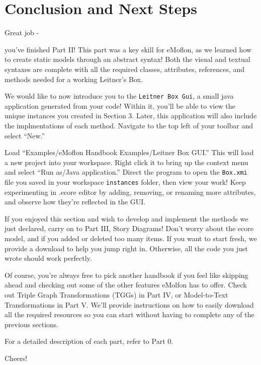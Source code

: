 \genHeader
\section{Conclusion and Next Steps}

\hypertarget{conclusion}{Great job -} you've finished Part II! This part was a key skill for eMoflon, as we learned how to create static models through an abstract syntax! Both the visual and textual syntaxes are complete with all the required classes, attributes, references, and methods needed for a working Leitner's Box.

We would like to now introduce you to the \texttt{Leitner Box Gui}, a small java application generated from your code! Within it, you'll be able to view the unique instances you created in Section 3. Later, this application will also include the implmentations of each method. Navigate to the top left of your toolbar and select ``New.''

Load ``Examples/eMoflon Handbook Examples/Leitner Box GUI.'' This will load a new project into your workspace. Right click it to bring up the context menu and select ``Run as/Java application.'' Direct the program to open the \texttt{Box.xmi} file you saved in your workspace \texttt{instances} folder, then view your work! Keep experimenting in .ecore editor by adding, removing, or renaming more attributes, and observe how they're reflected in the GUI.

If you enjoyed this section and wish to develop and implement the methods we just declared, carry on to Part III, Story Diagrams! Don't worry about the ecore model, and if you added or deleted too many items. If you want to start fresh, we provide a download to help you jump right in. Otherwise, all the code you just wrote should work perfectly.

Of course, you're always free to pick another handbook if you feel like skipping ahead and checking out some of the other features eMolfon has to offer. Check out Triple Graph Transformations (TGGs)  in Part IV, or Model-to-Text Transformations in Part V. We'll provide instructions on how to easily download all the required resources so you can start without having to complete any of the previous sections. 

For a detailed description of each part, refer to Part 0.

Cheers!